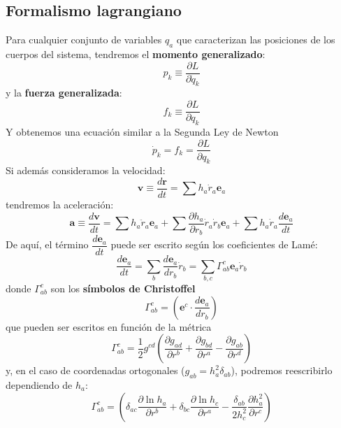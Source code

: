 \documentclass[]{report}
\numberwithin{equation}{section}
\newcommand{\0}{\textcolor{gray}{0}}
\begin{document}
\subsection{Formalismo lagrangiano}
Para cualquier conjunto de variables \({q_a}\) que caracterizan las posiciones de los cuerpos del sistema, tendremos el \textbf{momento generalizado}:
\begin{equation}
	p_k \equiv \frac{\partial L}{\partial \dot{q}_k}
\end{equation}
y la \textbf{fuerza generalizada}:
\begin{equation}
	f_k \equiv \frac{\partial L}{\partial q_k}
\end{equation}
Y obtenemos una ecuación similar a la Segunda Ley de Newton
\begin{equation}
	\dot{p}_k = f_k = \frac{\partial L}{\partial q_k}
\end{equation}
Si además consideramos la velocidad:
\begin{equation}
	\mathbf{v} \equiv \frac{d \mathbf{r}}{dt} = \sum h_a \dot{r}_a \mathbf{e}_a
\end{equation}
tendremos la aceleración:
\begin{equation}
	\mathbf{a} \equiv \frac{d \mathbf{v}}{dt} = \sum h_a\ddot{r}_a\mathbf{e}_a + \sum \frac{\partial h_a}{\partial r_b}\dot{r}_a\dot{r}_b\mathbf{e}_a + \sum h_a\dot{r}_a\frac{d\mathbf{e}_a}{dt}
\end{equation}
De aquí, el término \(\dfrac{d\mathbf{e}_a}{dt}\) puede ser escrito según los coeficientes de Lamé:
\begin{equation}
	\frac{d\mathbf{e}_a}{dt} = \sum_{b}\frac{d\mathbf{e}_a}{dr_b}\dot{r}_b = \sum_{b,c} \Gamma^{c}_{ab} \mathbf{e}_a \dot{r}_b
\end{equation}
donde \(\Gamma^{c}_{ab}\) son los \textbf{símbolos de Christoffel}
\begin{equation}
	\Gamma^{c}_{ab} = \left(\mathbf{e}^c \cdot \frac{d\mathbf{e}_a}{dr_b}\right)
\end{equation}
que pueden ser escritos en función de la métrica
\begin{equation}
	\Gamma^{c}_{ab} = \frac{1}{2} g^{cd} \left(\frac{\partial g_{ad}}{\partial r^b} + \frac{\partial g_{bd}}{\partial r^a} - \frac{\partial g_{ab}}{\partial r^d}\right)
\end{equation}
y, en el caso de coordenadas ortogonales (\(g_{ab} = h_a^2\delta_{ab}\)), podremos reescribirlo dependiendo de \(h_a\):
\begin{equation}
	\Gamma^{c}_{ab} = \left(\delta_{ac}\frac{\partial \ln h_{a}}{\partial r^b} + \delta_{bc}\frac{\partial \ln h_{c}}{\partial r^a} - \frac{\delta_{ab}}{2 h_c^2}\frac{\partial h_{a}^2}{\partial r^c}\right)
\end{equation}
\end{document}

